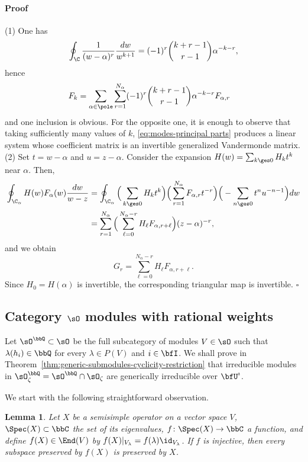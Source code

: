 \documentclass[reqno]{amsart}
\numberwithin{equation}{section}
\newtheorem*{lemma}{Lemma}
\newenvironment{pf}{\medskip\paragraph{{\sc Proof}}}{\hfill$\square$\par\medskip}
\begin{document}
\begin{pf}
(1) One has
\begin{equation}
	\oint_\C\frac{1}{(w-\alpha)^r}\frac{dw}{w^{k+1}}=
(-1)^{r}\binom{k+r-1}{r-1}\alpha^{-k-r},
\end{equation} 
hence
\begin{align}\label{eq:modes-principal parts}
F_k&
=\sum_{\alpha\in \pole}\sum_{r=1}^{N_\alpha}
(-1)^{r}\binom{k+r-1}{r-1}\alpha^{-k-r}F_{\alpha,r}
\end{align}
and one inclusion is obvious. For the opposite one, it is enough to observe that taking sufficiently many values of $k$, \eqref{eq:modes-principal parts} produces a linear system whose coefficient matrix is an invertible generalized Vandermonde matrix.\\

(2) Set $t=w-\alpha$ and $u=z-\alpha$. Consider the expansion $H(w)=\sum_{k\ges 0}H_kt^k$ near $\alpha$. Then,
\begin{align}
\oint_{\C_\alpha}H(w)F_\alpha(w)\frac{dw}{w-z}&=
\oint_{\C_\alpha}\Big(\sum_{k\ges0}H_kt^k\Big)\Big(\sum_{r=1}^{N_{\alpha}} F_{\alpha,r}t^{-r}\Big)\Big(-\sum_{n\ges0}t^nu^{-n-1}\Big)dw\\
&=\sum_{r=1}^{N_{\alpha}}\Big(\sum_{\ell=0}^{N_{\alpha}-r}H_\ell F_{\alpha, r+\ell}\Big)(z-\alpha)^{-r},	
\end{align}
and we obtain 
\begin{equation}
G_r=\sum_{\ell=0}^{N_{\alpha}-r}H_\ell F_{\alpha, r+\ell}.	
\end{equation}
Since $H_0=H(\alpha)$ is invertible, the corresponding triangular map is invertible.
\end{pf}

\subsection{Category $\sO$ modules with rational weights}\label{ss:cat-O-rational}
Let $\sO^\bbQ\subset\sO$ be the full subcategory of modules $V\in\sO$ such that $\lambda(h_i)\in\bbQ$ for every $\lambda\in P(V)$ and $i\in\bfI$. We shall prove in Theorem~\ref{thm:generic-submodules-cyclicity-restriction} that irreducible modules in $\sO^\bbQ_\zeta=\sO^\bbQ\cap\sO_\zeta$ are generically irreducible over $\bfU^\imath$.

We start with the following straightforward observation.

\begin{lemma}\label{lem:semisimple}
Let $X$ be a semisimple operator on a vector space $V$, $\Spec(X)\subset\bbC$ the set of its eigenvalues, $f\colon\Spec(X)\to\bbC$ a function, and define $f(X)\in\End(V)$ by $f(X)|_{V_\lambda}=f(\lambda)\id_{V_\lambda}$. If $f$ is injective, then every subspace preserved by $f(X)$ is preserved by $X$.
\end{lemma}
\end{document}
